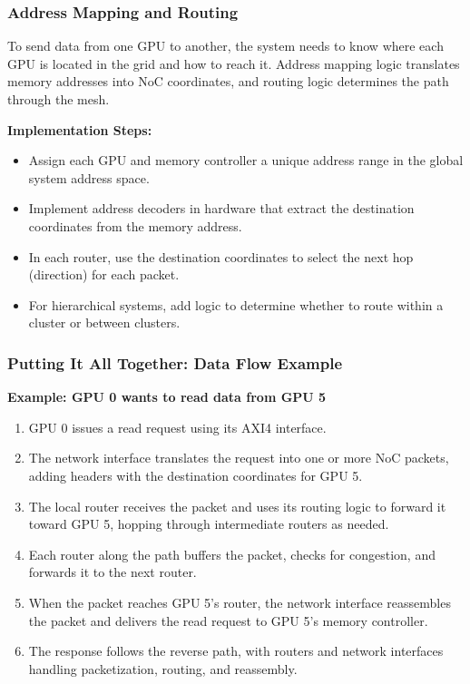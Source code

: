 \documentclass[11pt,a4paper]{article}
\begin{document}
\subsubsection{Address Mapping and Routing}
To send data from one GPU to another, the system needs to know where each GPU is located in the grid and how to reach it. Address mapping logic translates memory addresses into NoC coordinates, and routing logic determines the path through the mesh.

\textbf{Implementation Steps:}
\begin{itemize}
    \item Assign each GPU and memory controller a unique address range in the global system address space.
    \item Implement address decoders in hardware that extract the destination coordinates from the memory address.
    \item In each router, use the destination coordinates to select the next hop (direction) for each packet.
    \item For hierarchical systems, add logic to determine whether to route within a cluster or between clusters.
\end{itemize}

\subsubsection{Putting It All Together: Data Flow Example}
\textbf{Example: GPU 0 wants to read data from GPU 5}
\begin{enumerate}
    \item GPU 0 issues a read request using its AXI4 interface.
    \item The network interface translates the request into one or more NoC packets, adding headers with the destination coordinates for GPU 5.
    \item The local router receives the packet and uses its routing logic to forward it toward GPU 5, hopping through intermediate routers as needed.
    \item Each router along the path buffers the packet, checks for congestion, and forwards it to the next router.
    \item When the packet reaches GPU 5's router, the network interface reassembles the packet and delivers the read request to GPU 5's memory controller.
    \item The response follows the reverse path, with routers and network interfaces handling packetization, routing, and reassembly.
\end{enumerate}
\end{document}
